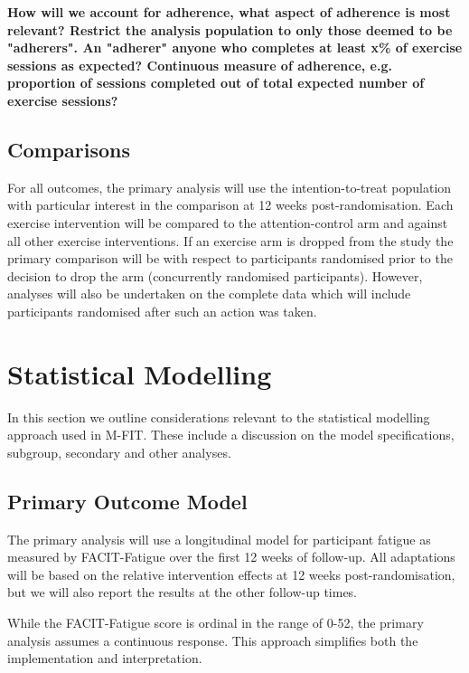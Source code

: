 \documentclass[
]{article}
\begin{document}
\textbf{
How will we account for adherence, what aspect of adherence is most relevant? 
Restrict the analysis population to only those deemed to be "adherers".
An "adherer" anyone who completes at least x\% of exercise sessions as expected?
Continuous measure of adherence, e.g. proportion of sessions completed out of total expected number of exercise sessions?
}

\hypertarget{analysis-comparisons}{%
\subsection{Comparisons}\label{analysis-comparisons}}

For all outcomes, the primary analysis will use the intention-to-treat population with particular interest in the comparison at 12 weeks post-randomisation.
Each exercise intervention will be compared to the attention-control arm and against all other exercise interventions.
If an exercise arm is dropped from the study the primary comparison will be with respect to participants randomised prior to the decision to drop the arm (concurrently randomised participants).
However, analyses will also be undertaken on the complete data which will include participants randomised after such an action was taken.

\clearpage

\hypertarget{statistical-modelling}{%
  \section{Statistical Modelling}\label{statistical-modelling}}

In this section we outline considerations relevant to the statistical modelling approach used in M-FIT.
These include a discussion on the model specifications, subgroup, secondary and other analyses.

\hypertarget{primary-model}{%
  \subsection{Primary Outcome Model}\label{primary-model}}

The primary analysis will use a longitudinal model for participant fatigue as measured by FACIT-Fatigue over the first 12 weeks of follow-up.
All adaptations will be based on the relative intervention effects at 12 weeks post-randomisation, but we will also report the results at the other follow-up times.

While the FACIT-Fatigue score is ordinal in the range of 0-52, the primary analysis assumes a continuous response.
This approach simplifies both the implementation and interpretation.
\end{document}
